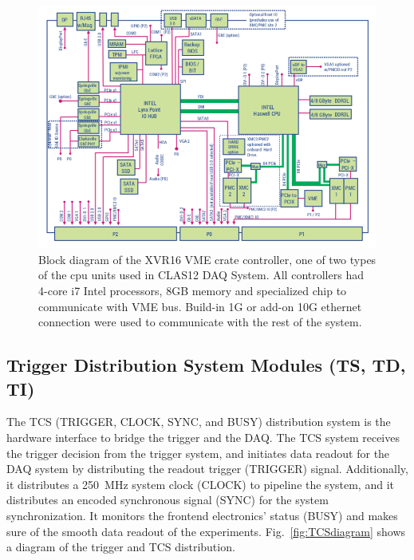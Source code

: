 \begin{figure}[hbt]
	\centering
	\includegraphics[width=1.0\columnwidth,keepaspectratio]{img/XVR16_diagram.png}
	\caption{Block diagram of the XVR16 VME crate controller, one of two types of the cpu units used in CLAS12 DAQ System. All controllers had 4-core i7 Intel processors, 8GB memory and specialized chip to communicate with VME bus. Build-in 1G or add-on 10G ethernet connection were used to communicate with the rest of the system.}
	\label{fig:XVR16diagram}
\end{figure}



\subsection{Trigger Distribution System Modules (TS, TD, TI)}
	
The TCS (TRIGGER, CLOCK, SYNC, and BUSY) distribution system \cite{tcs-ref} is the hardware interface to bridge the trigger and the DAQ.  The TCS system receives the trigger decision from the trigger system, and initiates data readout for the DAQ system by distributing the readout trigger (TRIGGER) signal.  Additionally, it distributes a 250~MHz system clock (CLOCK) to pipeline the system, and it distributes an encoded synchronous signal (SYNC) for the system synchronization.  It monitors the frontend electronics’ status (BUSY) and makes sure of the smooth data readout of the experiments. Fig.~\ref{fig:TCSdiagram} shows a diagram of the trigger and TCS distribution.

